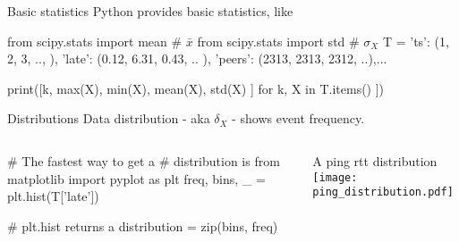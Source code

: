 \documentclass{beamer}[10]
\begin{document}
\iffalse
\begin{pyframe}{Gathering data}
The most time-consuming part of the analysis
\begin{itemize}
\item Parse log file with a strategy
\item Collect log samples and tinker in ipython
\item Write simple parsing library with tests
\end{itemize}
Curious? Attend `Python for System Administrators' on 24 July
\end{pyframe}
\fi
\iffalse
\begin{pyframe}{Gathering data}
\begin{pycode}
# Use dict + zip to convert
data = [('timestamp', 'late', 'retry', 'size', 'peers'),
(1379703191, 0.12, 2, 1, 123, 2313),
(1379703192, 12.43, 0, 1, 3223, 2303),
...
(1379 709000, 0.43, 0, 1, 3223, 2303)
]
# in
table = dict(zip(data[0],  zip(*data[1:]) ))
> { 'timestamp' : [ 1379703191, 1379703191, ..., 1379709000],
'late': [0.12, 12.43, ..., 0.43],
... }

\end{pycode}
\end{pyframe}
\fi


\begin{pyframe}{Basic statistics}
Python provides basic statistics, like
\begin{pycode}
from scipy.stats import mean	# $\bar{x}$
from scipy.stats import std	# $\sigma_{X}$
T = { 'ts': (1, 2, 3, .., ),
      'late': (0.12, 6.31, 0.43, .. ),
      'peers': (2313, 2313, 2312, ..),...}

print([k, max(X), min(X), mean(X), std(X) ]
        for k, X in T.items() ])
\end{pycode}
\end{pyframe}



\begin{pyframe}{Distributions}
Data distribution - aka $\delta_{X}$ - shows event frequency.
\begin{columns}
\begin{pycode}
# The fastest way to get a
#  distribution is
from matplotlib import pyplot as plt
freq, bins, _ = plt.hist(T['late'])

# plt.hist returns a
distribution = zip(bins, freq)
\end{pycode}
A ping rtt distribution
\texttt{[image: ping\_distribution.pdf]}
\end{columns}
\end{pyframe}
\end{document}
